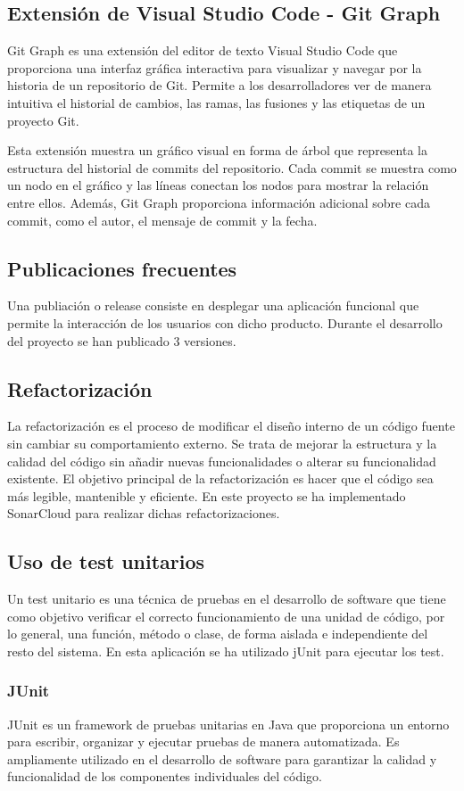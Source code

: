 \subsection{Extensión de Visual Studio Code - Git Graph}
Git Graph es una extensión del editor de texto Visual Studio Code que proporciona una interfaz gráfica interactiva para visualizar y navegar por la historia de un repositorio de Git. Permite a los desarrolladores ver de manera intuitiva el historial de cambios, las ramas, las fusiones y las etiquetas de un proyecto Git.

Esta extensión muestra un gráfico visual en forma de árbol que representa la estructura del historial de commits del repositorio. Cada commit se muestra como un nodo en el gráfico y las líneas conectan los nodos para mostrar la relación entre ellos. Además, Git Graph proporciona información adicional sobre cada commit, como el autor, el mensaje de commit y la fecha.
\subsection{Publicaciones frecuentes}
Una publiación o release consiste en desplegar una aplicación funcional que permite la interacción de los usuarios con dicho producto. Durante el desarrollo del proyecto se han publicado 3 versiones.
\subsection{Refactorización}
La refactorización es el proceso de modificar el diseño interno de un código fuente sin cambiar su comportamiento externo. Se trata de mejorar la estructura y la calidad del código sin añadir nuevas funcionalidades o alterar su funcionalidad existente. El objetivo principal de la refactorización es hacer que el código sea más legible, mantenible y eficiente. En este proyecto se ha implementado SonarCloud para realizar dichas refactorizaciones.
\subsection{Uso de test unitarios}
Un test unitario es una técnica de pruebas en el desarrollo de software que tiene como objetivo verificar el correcto funcionamiento de una unidad de código, por lo general, una función, método o clase, de forma aislada e independiente del resto del sistema. En esta aplicación se ha utilizado jUnit para ejecutar los test.
\subsubsection{JUnit}
JUnit es un framework de pruebas unitarias en Java que proporciona un entorno para escribir, organizar y ejecutar pruebas de manera automatizada. Es ampliamente utilizado en el desarrollo de software para garantizar la calidad y funcionalidad de los componentes individuales del código.

